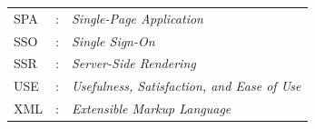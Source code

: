 \begin{center}
\begin{table}[htbp]
\begin{tabular}{l l l}
			SPA   & : & \textit{Single-Page Application}                      \\ %
			SSO   & : & \textit{Single Sign-On}                               \\ %
			SSR   & : & \textit{Server-Side Rendering}                        \\ %
			USE   & : & \textit{Usefulness, Satisfaction, and Ease of Use}    \\ %
			XML   & : & \textit{Extensible Markup Language}                   \\ %
		\end{tabular}
	\end{table}
\end{center}

